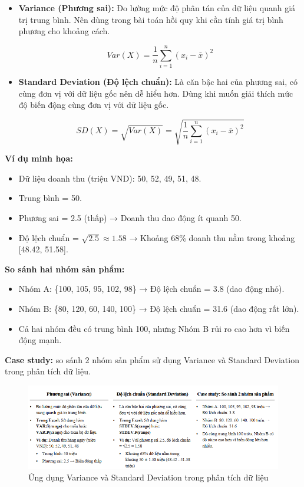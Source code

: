 \documentclass[11pt]{article}
\begin{document}
\begin{itemize}
    \item \textbf{Variance (Phương sai):} Đo lường mức độ phân tán của dữ liệu quanh giá trị trung bình. Nên dùng trong bài toán hồi quy khi cần tính giá trị bình phương cho khoảng cách.

    \[
        Var(X) = \frac{1}{n} \sum_{i=1}^{n} (x_i - \bar{x})^2
    \]

    \item \textbf{Standard Deviation (Độ lệch chuẩn):} Là căn bậc hai của phương sai, có cùng đơn vị với dữ liệu gốc nên dễ hiểu hơn. Dùng khi muốn giải thích mức độ biến động cùng đơn vị với dữ liệu gốc.

    \[
        SD(X) = \sqrt{Var(X)} = \sqrt{\frac{1}{n} \sum_{i=1}^{n} (x_i - \bar{x})^2}
    \]
\end{itemize}

\textbf{Ví dụ minh họa:}
\begin{itemize}
    \item Dữ liệu doanh thu (triệu VND): 50, 52, 49, 51, 48.
    \item Trung bình = 50.
    \item Phương sai = 2.5 (thấp) → Doanh thu dao động ít quanh 50.
    \item Độ lệch chuẩn = $\sqrt{2.5} \approx 1.58$ → Khoảng 68\% doanh thu nằm trong khoảng [48.42, 51.58].
\end{itemize}

\textbf{So sánh hai nhóm sản phẩm:}
\begin{itemize}
    \item Nhóm A: \{100, 105, 95, 102, 98\} → Độ lệch chuẩn = 3.8 (dao động nhỏ).
    \item Nhóm B: \{80, 120, 60, 140, 100\} → Độ lệch chuẩn = 31.6 (dao động rất lớn).
    \item Cả hai nhóm đều có trung bình 100, nhưng Nhóm B rủi ro cao hơn vì biến động mạnh.
\end{itemize}

\textbf{Case study:} so sánh 2 nhóm sản phẩm sử dụng Variance và Standard Deviation trong phân tích dữ liệu.
\begin{figure}[H]
    \centering
    \includegraphics[width=1\linewidth]{images/variance_std_usecase.png}
    \caption{Ứng dụng Variance và Standard Deviation trong phân tích dữ liệu}
    \label{fig:variance vs std}
\end{figure}
\end{document}
